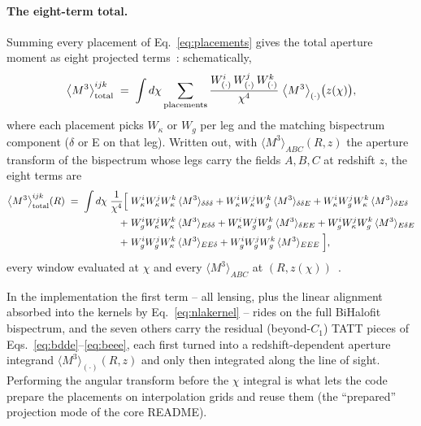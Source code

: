 \documentclass[11pt]{article}
\numberwithin{equation}{section}
\begin{document}
\paragraph{The eight-term total.}
Summing every placement of Eq.~\eqref{eq:placements} gives the total
aperture moment as eight projected terms~\cite{GomesTATT}:
schematically,
\begin{equation}
  \bigl\langle M^3 \bigr\rangle^{ijk}_{\rm total}
  \;=\;
  \int d\chi \sum_{\rm placements}
  \frac{W^{i}_{(\cdot)}\, W^{j}_{(\cdot)}\, W^{k}_{(\cdot)}}
       {\chi^4}\;
  \bigl\langle M^3\bigr\rangle_{(\cdot)}\bigl(z(\chi)\bigr) ,
  \label{eq:map3total}
\end{equation}
where each placement picks $W_\kappa$ or $W_g$ per leg and the
matching bispectrum component ($\delta$ or E on that leg).  Written
out, with $\langle M^3\rangle_{ABC}(R, z)$ the aperture transform
of the bispectrum whose legs carry the fields $A, B, C$ at redshift
$z$, the eight terms are
\begin{equation}
\begin{split}
  \bigl\langle M^3 \bigr\rangle^{ijk}_{\rm total}(R)
  \;=\; \int d\chi\; \frac{1}{\chi^4} \Bigl[\;
  & W^i_\kappa W^j_\kappa W^k_\kappa\,
    \langle M^3\rangle_{\delta\delta\delta}
  + W^i_\kappa W^j_\kappa W^k_g\,
    \langle M^3\rangle_{\delta\delta E}
  + W^i_\kappa W^j_g W^k_\kappa\,
    \langle M^3\rangle_{\delta E\delta} \\
  +\;& W^i_g W^j_\kappa W^k_\kappa\,
    \langle M^3\rangle_{E\delta\delta}
  + W^i_\kappa W^j_g W^k_g\,
    \langle M^3\rangle_{\delta EE}
  + W^i_g W^j_\kappa W^k_g\,
    \langle M^3\rangle_{E\delta E} \\
  +\;& W^i_g W^j_g W^k_\kappa\,
    \langle M^3\rangle_{EE\delta}
  + W^i_g W^j_g W^k_g\,
    \langle M^3\rangle_{EEE}
  \;\Bigr] ,
\end{split}
  \label{eq:eightterms}
\end{equation}
every window evaluated at $\chi$ and every
$\langle M^3\rangle_{ABC}$ at $(R, z(\chi))$~\cite{GomesTATT}.

In the implementation the first term -- all lensing, plus the linear
alignment absorbed into the kernels by
Eq.~\eqref{eq:nlakernel} -- rides on the full BiHalofit bispectrum,
and the seven others carry the residual (beyond-$C_1$) TATT pieces
of Eqs.~\eqref{eq:bdde}--\eqref{eq:beee}, each first turned into a
redshift-dependent aperture integrand
$\langle M^3\rangle_{(\cdot)}(R, z)$ and only then integrated along
the line of sight.  Performing the angular transform before the
$\chi$ integral is what lets the code prepare the placements on
interpolation grids and reuse them (the ``prepared'' projection mode
of the core README).
\end{document}
